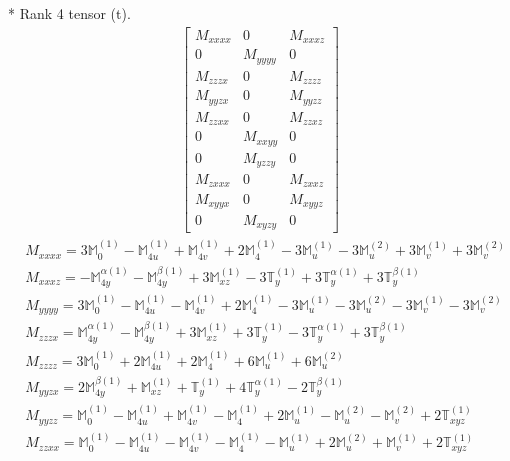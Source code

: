 \documentclass[fleqn,8pt,landscape]{jsarticle}
\begin{document}
* Rank 4 tensor (t).
\begin{align*}
\begin{bmatrix} M_{xxxx} & 0 & M_{xxxz} \\ 0 & M_{yyyy} & 0 \\ M_{zzzx} & 0 & M_{zzzz} \\ M_{yyzx} & 0 & M_{yyzz} \\ M_{zzxx} & 0 & M_{zzxz} \\ 0 & M_{xxyy} & 0 \\ 0 & M_{yzzy} & 0 \\ M_{zxxx} & 0 & M_{zxxz} \\ M_{xyyx} & 0 & M_{xyyz} \\ 0 & M_{xyzy} & 0 \end{bmatrix}
\end{align*}
\begin{align*}
& M_{xxxx} = 3 \mathbb{M}_{0}^{(1)} - \mathbb{M}_{4u}^{(1)} + \mathbb{M}_{4v}^{(1)} + 2 \mathbb{M}_{4}^{(1)} - 3 \mathbb{M}_{u}^{(1)} - 3 \mathbb{M}_{u}^{(2)} + 3 \mathbb{M}_{v}^{(1)} + 3 \mathbb{M}_{v}^{(2)} \\
& M_{xxxz} = - \mathbb{M}_{4y}^{\alpha(1)} - \mathbb{M}_{4y}^{\beta(1)} + 3 \mathbb{M}_{xz}^{(1)} - 3 \mathbb{T}_{y}^{(1)} + 3 \mathbb{T}_{y}^{\alpha(1)} + 3 \mathbb{T}_{y}^{\beta(1)} \\
& M_{yyyy} = 3 \mathbb{M}_{0}^{(1)} - \mathbb{M}_{4u}^{(1)} - \mathbb{M}_{4v}^{(1)} + 2 \mathbb{M}_{4}^{(1)} - 3 \mathbb{M}_{u}^{(1)} - 3 \mathbb{M}_{u}^{(2)} - 3 \mathbb{M}_{v}^{(1)} - 3 \mathbb{M}_{v}^{(2)} \\
& M_{zzzx} = \mathbb{M}_{4y}^{\alpha(1)} - \mathbb{M}_{4y}^{\beta(1)} + 3 \mathbb{M}_{xz}^{(1)} + 3 \mathbb{T}_{y}^{(1)} - 3 \mathbb{T}_{y}^{\alpha(1)} + 3 \mathbb{T}_{y}^{\beta(1)} \\
& M_{zzzz} = 3 \mathbb{M}_{0}^{(1)} + 2 \mathbb{M}_{4u}^{(1)} + 2 \mathbb{M}_{4}^{(1)} + 6 \mathbb{M}_{u}^{(1)} + 6 \mathbb{M}_{u}^{(2)} \\
& M_{yyzx} = 2 \mathbb{M}_{4y}^{\beta(1)} + \mathbb{M}_{xz}^{(1)} + \mathbb{T}_{y}^{(1)} + 4 \mathbb{T}_{y}^{\alpha(1)} - 2 \mathbb{T}_{y}^{\beta(1)} \\
& M_{yyzz} = \mathbb{M}_{0}^{(1)} - \mathbb{M}_{4u}^{(1)} + \mathbb{M}_{4v}^{(1)} - \mathbb{M}_{4}^{(1)} + 2 \mathbb{M}_{u}^{(1)} - \mathbb{M}_{u}^{(2)} - \mathbb{M}_{v}^{(2)} + 2 \mathbb{T}_{xyz}^{(1)} \\
& M_{zzxx} = \mathbb{M}_{0}^{(1)} - \mathbb{M}_{4u}^{(1)} - \mathbb{M}_{4v}^{(1)} - \mathbb{M}_{4}^{(1)} - \mathbb{M}_{u}^{(1)} + 2 \mathbb{M}_{u}^{(2)} + \mathbb{M}_{v}^{(1)} + 2 \mathbb{T}_{xyz}^{(1)} \\

\end{align*}
\end{document}
